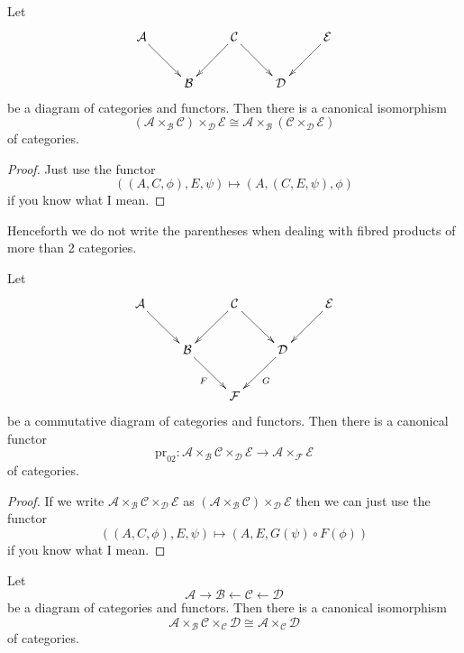 \begin{lemma}
\label{lemma-associativity-2-fibre-product}
Let
$$
\xymatrix{
\mathcal{A} \ar[rd] & & \mathcal{C} \ar[ld] \ar[rd] & & \mathcal{E} \ar[ld] \\
& \mathcal{B} & & \mathcal{D}
}
$$
be a diagram of categories and functors.
Then there is a canonical isomorphism
$$
(\mathcal{A} \times_{\mathcal{B}} \mathcal{C}) \times_{\mathcal{D}} \mathcal{E}
\cong
\mathcal{A} \times_{\mathcal{B}} (\mathcal{C} \times_{\mathcal{D}} \mathcal{E})
$$
of categories.
\end{lemma}

\begin{proof}
Just use the functor
$$
((A, C, \phi), E, \psi)
\longmapsto
(A, (C, E, \psi), \phi)
$$
if you know what I mean.
\end{proof}

\noindent
Henceforth we do not write the parentheses when dealing with fibred products
of more than 2 categories.

\begin{lemma}
\label{lemma-triple-2-fibre-product-pr02}
Let
$$
\xymatrix{
\mathcal{A} \ar[rd] & & \mathcal{C} \ar[ld] \ar[rd] & & \mathcal{E} \ar[ld] \\
& \mathcal{B} \ar[rd]_F & & \mathcal{D} \ar[ld]^G \\
& & \mathcal{F} &
}
$$
be a commutative diagram of categories and functors.
Then there is a canonical functor
$$
\text{pr}_{02} :
\mathcal{A} \times_{\mathcal{B}} \mathcal{C} \times_{\mathcal{D}} \mathcal{E}
\longrightarrow
\mathcal{A} \times_{\mathcal{F}} \mathcal{E}
$$
of categories.
\end{lemma}

\begin{proof}
If we write
$\mathcal{A} \times_{\mathcal{B}} \mathcal{C}
\times_{\mathcal{D}} \mathcal{E}$
as
$(\mathcal{A} \times_{\mathcal{B}} \mathcal{C})
\times_{\mathcal{D}} \mathcal{E}$
then we can just use the functor
$$
((A, C, \phi), E, \psi)
\longmapsto
(A, E, G(\psi) \circ F(\phi))
$$
if you know what I mean.
\end{proof}

\begin{lemma}
\label{lemma-2-fibre-product-erase-factor}
Let
$$
\mathcal{A} \to
\mathcal{B} \leftarrow \mathcal{C} \leftarrow \mathcal{D}
$$
be a diagram of categories and functors.
Then there is a canonical isomorphism
$$
\mathcal{A} \times_{\mathcal{B}} \mathcal{C} \times_{\mathcal{C}} \mathcal{D}
\cong
\mathcal{A} \times_{\mathcal{C}} \mathcal{D}
$$
of categories.
\end{lemma}

